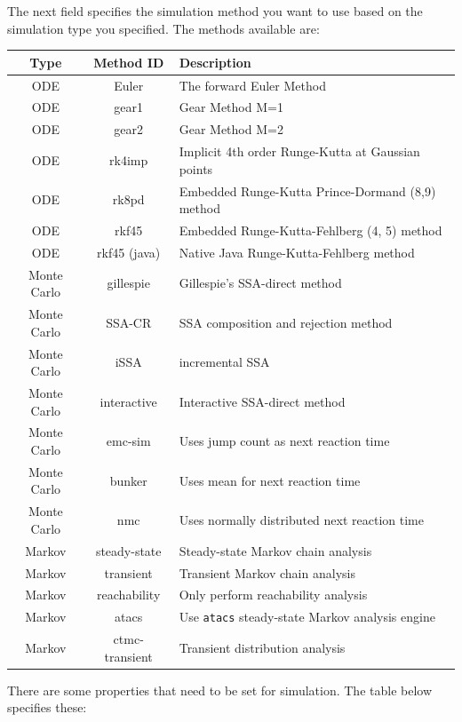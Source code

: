 \documentclass[titlepage,11pt]{article}
\begin{document}
\noindent
The next field specifies the simulation method you want to use based on the simulation type you specified. The methods available are:
\begin{center}
\begin{tabular}{|c|c|l|}
\hline
Type & Method ID & Description \\ \hline \hline
ODE  & Euler     & The forward Euler Method \\ \hline
ODE  & gear1     & Gear Method M=1 \\ \hline
ODE  & gear2     & Gear Method M=2 \\ \hline
ODE  & rk4imp    & Implicit 4th order Runge-Kutta at Gaussian points \\ \hline
ODE  & rk8pd     & Embedded Runge-Kutta Prince-Dormand (8,9) method \\ \hline
ODE  & rkf45     & Embedded Runge-Kutta-Fehlberg (4, 5) method \\ \hline 
ODE  & rkf45 (java) & Native Java Runge-Kutta-Fehlberg method \\ \hline 
Monte Carlo & gillespie & Gillespie's SSA-direct method \\ \hline  
Monte Carlo & SSA-CR & SSA composition and rejection method \\ \hline  
Monte Carlo & iSSA & incremental SSA \\ \hline    
Monte Carlo & interactive & Interactive SSA-direct method \\ \hline  
Monte Carlo & emc-sim   & Uses jump count as next reaction time \\ \hline 
Monte Carlo & bunker    & Uses mean for next reaction time \\ \hline 
Monte Carlo & nmc       & Uses normally distributed next reaction time \\ \hline 
Markov & steady-state & Steady-state Markov chain analysis \\ \hline
Markov & transient & Transient Markov chain analysis \\ \hline
Markov & reachability & Only perform reachability analysis \\ \hline
Markov & atacs & Use {\tt atacs} steady-state Markov analysis engine \\ \hline
Markov & ctmc-transient & Transient distribution analysis \\ \hline
\end{tabular}
\end{center}

There are some properties that need to be set for simulation.
The table below specifies these:
\end{document}

